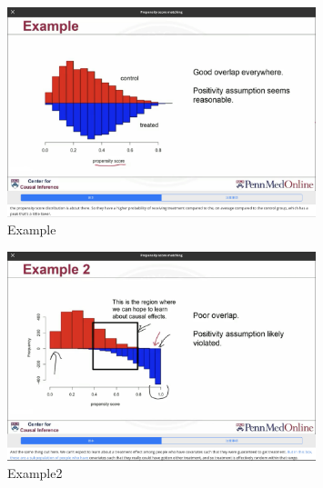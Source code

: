 


\begin{figure}[htbp]
	\setlength{\abovecaptionskip}{0pt}     %
	\setlength{\belowcaptionskip}{10pt}
	\vspace{-0cm}  %
	\setlength{\abovecaptionskip}{-0cm}   %
	\setlength{\belowcaptionskip}{-0cm}   %
	\centering
	\includegraphics[width=0.8\textwidth]{figure/Example.jpg}
	\caption{Example}
	\label{Example}
\end{figure}
\begin{figure}[htbp]
	\setlength{\abovecaptionskip}{0pt}     %
	\setlength{\belowcaptionskip}{10pt}
	\vspace{-0cm}  %
	\setlength{\abovecaptionskip}{-0cm}   %
	\setlength{\belowcaptionskip}{-0cm}   %
	\centering
	\includegraphics[width=0.8\textwidth]{figure/Example2.jpg}
	\caption{Example2}
	\label{Example2}
\end{figure}

